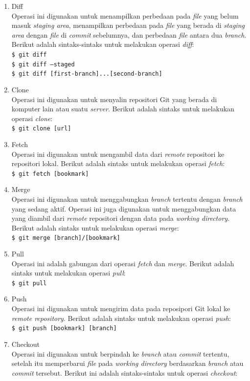 \begin{enumerate}
\item Diff\\
Operasi ini digunakan untuk menampilkan perbedaan pada \textit{file} yang belum masuk \textit{staging area}, menampilkan perbedaan pada \textit{file} yang berada di \textit{staging area} dengan \textit{file} di \textit{commit} sebelumnya, dan perbedaan \textit{file} antara dua \textit{branch}.  Berikut adalah sintaks-sintaks untuk melakukan operasi \textit{diff}:\\
\texttt{\$ git diff} \\
\texttt{\$ git diff --staged}\\
\texttt{\$ git diff [first-branch]...[second-branch]}
\item Clone\\
Operasi ini digunakan untuk menyalin repositori Git yang berada di komputer lain atau suatu \textit{server}. Berikut adalah sintaks untuk melakukan operasi \textit{clone}:\\
\texttt{\$ git clone [url]}
\item Fetch\\
Operasi ini digunakan untuk mengambil data dari \textit{remote} repositori ke repositori lokal. Berikut adalah sintaks untuk melakukan operasi \textit{fetch}:\\
\texttt{\$ git fetch [bookmark]}
\item Merge\\
Operasi ini digunakan untuk menggabungkan \textit{branch} tertentu dengan \textit{branch} yang sedang aktif. Operasi ini juga digunakan untuk menggabungkan data yang diambil dari \textit{remote} repositori dengan data pada \textit{working directory}. Berikut adalah sintaks untuk melakukan operasi \textit{merge}:\\
\texttt{\$ git merge [branch]/[bookmark]}
\item Pull\\
Operasi ini adalah gabungan dari operasi \textit{fetch} dan \textit{merge}. Berikut adalah sintaks untuk melakukan operasi \textit{pull}:\\
\texttt{\$ git pull }
\item Push\\
Operasi ini digunakan untuk mengirim data pada reposipori Git lokal ke \textit{remote repository}.
Berikut adalah sintaks untuk melakukan operasi \textit{push}:\\
\texttt{\$ git push [bookmark] [branch]}
\item Checkout\\
Operasi ini digunakan untuk berpindah ke \textit{branch} atau \textit{commit} tertentu, setelah itu memperbarui \textit{file} pada \textit{working directory} berdasarkan \textit{branch} atau \textit{commit} tersebut. Berikut ini adalah sintaks-sintaks untuk operasi \textit{checkout}:\\

\end{enumerate}
